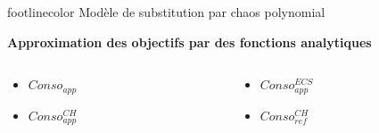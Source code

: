 \documentclass[xcolor=x11names, compress, 11pt]{beamer}
\makeatletter
\DeclarePairedDelimiter\abs{\lvert}{\rvert}
\let\oldabs\abs
\def\abs{\@ifstar{\oldabs}{\oldabs*}}
\newcommand{\addsubtitle}[1]{%
\begin{beamercolorbox}[sep=2pt,center,shadow=true,rounded=true]{footlinecolor}
    #1\par%
\end{beamercolorbox}%
}
\makeatother
\begin{document}
\begin{frame}[t]
    \addsubtitle{Modèle de substitution par chaos polynomial}
    \vfill
    \centering
    \textbf{Approximation des objectifs par des fonctions analytiques}
    \begin{columns}
        \begin{column}{0.5\textwidth}
            \begin{itemize}
                \item $Conso_{app}$
                \item $Conso_{app}^{CH}$
            \end{itemize}
        \end{column}
        \begin{column}{0.5\textwidth}
            \begin{itemize}
                \item $Conso_{app}^{ECS}$
                \item $Conso_{ref}^{CH}$
            \end{itemize}
        \end{column}
    \end{columns}

    \vfill



\end{frame}
\end{document}
